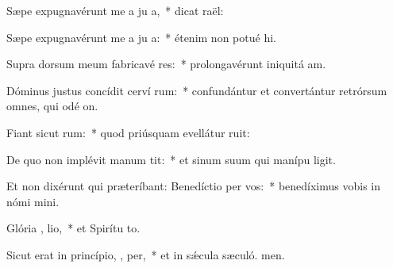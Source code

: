 \item Sæpe expugnavérunt me a ju a,~* dicat  raël:
\item Sæpe expugnavérunt me a ju a:~* étenim non potué hi.
\item Supra dorsum meum fabricavé res:~* prolongavérunt iniquitá am.
\item Dóminus justus concídit cerví rum:~* confundántur et convertántur retrórsum omnes, qui odé on.
\item Fiant sicut  rum:~* quod priúsquam evellátur ruit:
\item De quo non implévit manum   tit:~* et sinum suum qui manípu ligit.
\item Et non dixérunt qui præteríbant: Benedíctio  per vos:~* benedíximus vobis in nómi mini.
\item Glória ,  lio,~* et Spirítu to.
\item Sicut erat in princípio,  ,  per,~* et in sǽcula sæculó. men.
